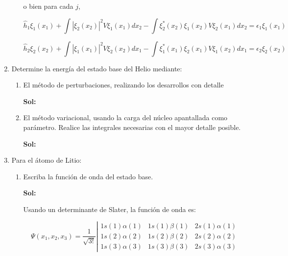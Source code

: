 \documentclass[12pt,a4paper]{article}
\begin{document}
\begin{enumerate}
\begin{enumerate}
    o bien para cada $j$,
    
    \begin{equation*}
        \hat{h}_{1}\xi_{1}(x_1)+ \int |\xi_{2}(x_2)|^2 V\xi_1(x_1) dx_2 - \int \xi_{2}^{*} (x_2) \xi_1 (x_2) V\xi_2 (x_1) dx_2 =\epsilon_1 \xi_1 (x_1)
    \end{equation*}
    
    \begin{equation*}
        \hat{h}_{2}\xi_{2}(x_2)+ \int |\xi_{1}(x_1)|^2 V\xi_2(x_2) dx_1 - \int \xi_{1}^{*} (x_1) \xi_2 (x_1) V\xi_1 (x_2) dx_1 =\epsilon_2 \xi_2 (x_2)
    \end{equation*}

\end{enumerate}






\item Determine la energía del estado base del Helio mediante:

\begin{enumerate}
    \item El método de perturbaciones, realizando los desarrollos con detalle
    
    \textbf{Sol:}
    
    \item El método variacional, usando la carga del núcleo apantallada como parámetro.
    Realice las integrales necesarias con el mayor detalle posible.
    
    \textbf{Sol:}
    
\end{enumerate}






\item Para el átomo de Litio:

\begin{enumerate}
    \item Escriba la función de onda del estado base.
    
    \textbf{Sol:}
    
    Usando un determinante de Slater, la función de onda es:
    
    \begin{equation*}
        \Psi(x_1,x_2,x_3) = \frac{1}{\sqrt{3!}}\left| \begin{matrix}
        1s(1)\alpha(1) & 1s(1) \beta(1) & 2s(1) \alpha(1) \\
        1s(2)\alpha (2) & 1s(2) \beta(2) & 2s(2) \alpha(2) \\
        1s(3) \alpha(3) & 1s(3) \beta (3) & 2s(3) \alpha (3)
        

\end{matrix}
\end{equation*}
\end{enumerate}
\end{enumerate}
\end{document}
